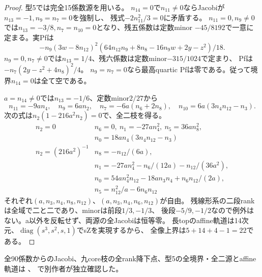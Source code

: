 \documentclass[a4paper,11pt]{ltjsarticle}
\theoremstyle{definition}
\begin{document}
\begin{proof}
型5では完全15係数源を用いる。
$n_{14}=0$で$n_{11}\ne0$ならJacobiが$n_{13}=-1,n_9=n_7=0$を強制し、
残式$-2n_{11}^2/3=0$に矛盾する。
$n_{11}=0,n_9\ne0$では$n_{13}=-3/8,n_7=n_{10}=0$となり、残五係数は定数minor
$-45/8192$で一意に定まる。実Pfは
\[
 -n_9(3w-8n_{12})^2(64n_{12}n_9+8n_8-16n_9w+2y-z^2)/18.
\]
$n_9=0,n_7\ne0$では$n_{13}=1/4$、残六係数は定数minor$-315/1024$で定まり、
Pfは$-n_7(2y-z^2+4n_8)^2/4$。
$n_9=n_7=0$なら最高quartic Pfは零である。従って境界$n_{14}=0$は全て空である。

$a=n_{14}\ne0$では$n_{13}=-1/6$、定数minor$2/27$から
\[
 n_{11}=-9an_4,\quad n_9=6an_2,\quad
 n_7=-6a(n_6+2n_8),\quad n_{10}=6a(3n_4n_{12}-n_3).
\]
次の式は$n_2(1-216a^2n_2)=0$で、全二枝を得る。
\[
\begin{array}{c|l}
 n_2=0& n_6=0,\ n_1=-27an_4^2,\ n_5=36an_8^2,\\
 &n_0=18an_4(3n_4n_{12}-n_3)\\\hline
 n_2=(216a^2)^{-1}&n_8=-n_{12}/(6a),\\
 &n_1=-27an_4^2-n_6/(12a)-n_{12}/(36a^2),\\
 &n_0=54an_4^2n_{12}-18an_3n_4+n_6n_{12}/(2a),\\
 &n_5=n_{12}^2/a-6n_6n_{12}
\end{array}
\]
それぞれ$(a,n_3,n_4,n_8,n_{12})$、$(a,n_3,n_4,n_6,n_{12})$が自由。
残線形系の二段rankは全域で二と二であり、minorは前段$1/3,-1/3$、
後段$-5/9,-1/2$なので例外はない。a以外を反転せず、両源の全Jacobiは恒等零。
長topのaffine軌道は14次元、$\operatorname{diag}(s^3,s^2,s,1)$でsZを実現するから、
全像上界は$5+14+4-1=22$である。
\end{proof}
全90係数からのJacobi、九core枝の全rank降下点、型5の全境界・全二源とaffine軌道は
、
で別作者が独立確認した。
\end{document}
